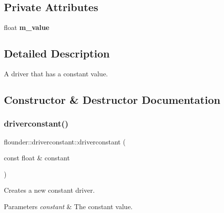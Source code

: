 \subsection*{Private Attributes}
\begin{DoxyCompactItemize}
\item 
\mbox{\label{classflounder_1_1driverconstant_a1e02a3e81305e1caef95303ca288d20b}} 
float {\bfseries m\+\_\+value}
\end{DoxyCompactItemize}


\subsection{Detailed Description}
A driver that has a constant value. 



\subsection{Constructor \& Destructor Documentation}
\mbox{\label{classflounder_1_1driverconstant_a678370c3748065cea8fc7ca6f46c2a19}} 
\subsubsection{\texorpdfstring{driverconstant()}{driverconstant()}}
{\footnotesize\ttfamily flounder\+::driverconstant\+::driverconstant (\begin{DoxyParamCaption}\item[{const float \&}]{constant }\end{DoxyParamCaption})}



Creates a new constant driver. 


\begin{DoxyParams}{Parameters}
{\em constant} & The constant value. \\
\hline
\end{DoxyParams}
\mbox{\label{classflounder_1_1driverconstant_abedf27fbdda1f3521c15e555ba54633e}} 

